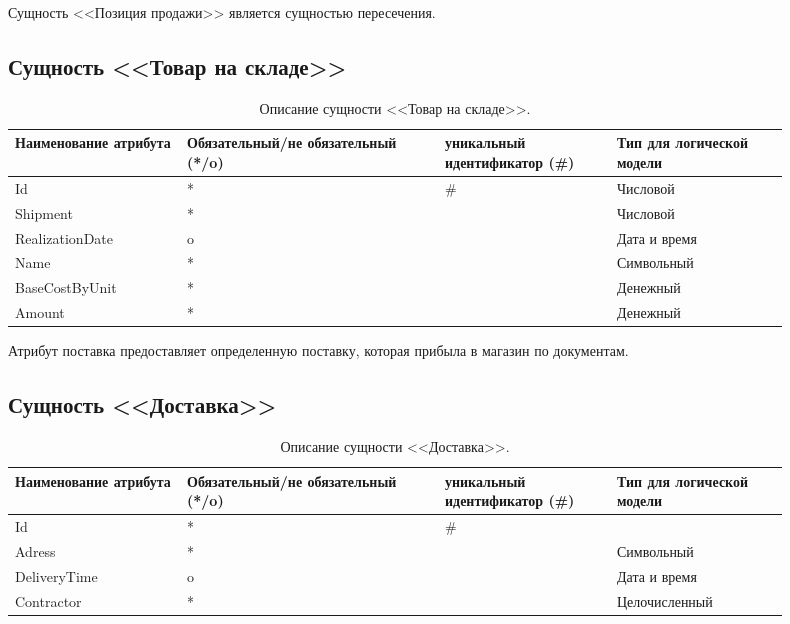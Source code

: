 \documentclass[14pt]{extreport}
\begin{document}
        Сущность <<Позиция продажи>> является сущностью пересечения.


    \subsection*{Сущность <<Товар на складе>>}

        \begin{table}[H]
            \begin{tabular}{|p{0.2\linewidth}|p{0.3\linewidth}|p{0.2\linewidth}|p{0.2\linewidth}|}
                \hline
                Наименование атрибута & Обязательный/не обязательный (*/o) & уникальный идентификатор (\#) & Тип для логической модели
                \\ \hline
                Id & * & \# & Числовой \\ \hline
                Shipment & * & & Числовой\\ \hline
                RealizationDate & o & & Дата и время \\ \hline
                Name & * &  & Символьный  \\ \hline
                BaseCostByUnit & * & & Денежный \\ \hline
                Amount & * & & Денежный \\ \hline 
            \end{tabular}
            \caption{Описание сущности <<Товар на складе>>.}
        \end{table}

        Атрибут поставка предоставляет определенную поставку, которая прибыла в магазин по документам.
    
    \subsection*{Сущность <<Доставка>>}

        \begin{table}[H]
            \begin{tabular}{|p{0.2\linewidth}|p{0.3\linewidth}|p{0.2\linewidth}|p{0.2\linewidth}|}
                \hline
                Наименование атрибута & Обязательный/не обязательный (*/o) & уникальный идентификатор (\#) & Тип для логической модели
                \\ \hline
                Id & * & \# & \\ \hline
                Adress & * & & Символьный\\ \hline
                DeliveryTime & o & & Дата и время \\ \hline
                Contractor & * & & Целочисленный \\ \hline
            \end{tabular}
            \caption{Описание сущности <<Доставка>>.}
        \end{table}
\end{document}
